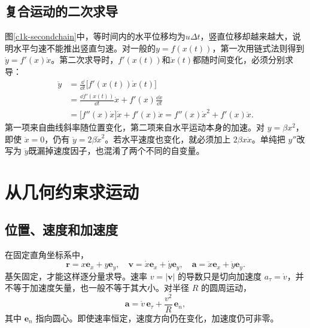 \subsection{复合运动的二次求导}
图\ref{c1k-secondchain}中，等时间内的水平位移均为$u\Delta t$，竖直位移却越来越大，说明水平匀速不能推出竖直匀速。对一般的$y=f(x(t))$，第一次用链式法则得到$\dot y=f'(x)\dot x$。第二次求导时，$f'(x(t))$和$\dot x(t)$都随时间变化，必须分别求导：
\begin{align*}
\ddot y
&=\frac{\dd}{\dd t}\bigl[f'(x(t))\dot x(t)\bigr]\\
&=\frac{\dd f'(x(t))}{\dd t}\dot x
  +f'(x)\frac{\dd\dot x}{\dd t}\\
&=\bigl[f''(x)\dot x\bigr]\dot x+f'(x)\ddot x
=f''(x)\dot x^2+f'(x)\ddot x.
\end{align*}
第一项来自曲线斜率随位置变化，第二项来自水平运动本身的加速。对 $y=\beta x^2$，即使 $\ddot x=0$，仍有 $\ddot y=2\beta\dot x^2$。若水平速度也变化，就必须加上 $2\beta x\ddot x$。单纯把 $y''$改写为 $\ddot y$既漏掉速度因子，也混淆了两个不同的自变量。


\section{从几何约束求运动}
\subsection{位置、速度和加速度}
在固定直角坐标系中，
\[
 \bm r=x\bm e_x+y\bm e_y,\quad
 \bm v=\dot x\bm e_x+\dot y\bm e_y,\quad
 \bm a=\ddot x\bm e_x+\ddot y\bm e_y.
\]
基矢固定，才能这样逐分量求导。速率 $v=|\bm v|$ 的导数只是切向加速度 $a_\tau=\dot v$，并不等于加速度矢量，也一般不等于其大小。对半径 $R$ 的圆周运动，
\[
 \bm a=\dot v\,\bm e_\tau+\frac{v^2}R\,\bm e_n,
\]
其中 $\bm e_n$ 指向圆心。即使速率恒定，速度方向仍在变化，加速度仍可非零。

